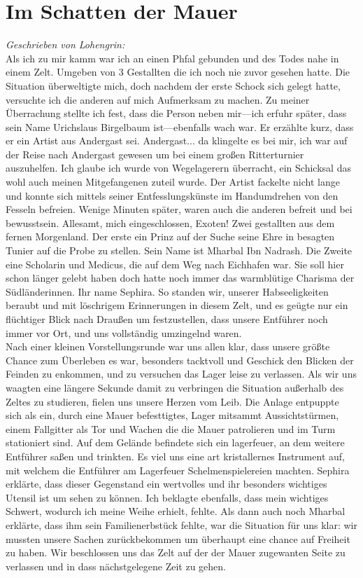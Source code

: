 \documentclass{book}
\begin{document}
    \chapter*{Im Schatten der Mauer}
    \emph{Geschrieben von Lohengrin:}\\
    Als ich zu mir kamm war ich an einen Phfal gebunden und des Todes nahe in einem Zelt. Umgeben von 3 Gestallten die ich noch nie zuvor gesehen hatte. Die Situation überweltigte mich, doch nachdem der erste Schock sich gelegt hatte, versuchte ich die anderen auf mich Aufmerksam zu machen. Zu meiner Überrachung stellte ich fest, dass die Person neben mir---ich erfuhr später, dass sein Name Urichslaus Birgelbaum ist---ebenfalls wach war. Er erzählte kurz, dass er ein Artist aus Andergast sei. Andergast... da klingelte es bei mir, ich war auf der Reise nach Andergast gewesen um bei einem großen Ritterturnier auszuhelfen. Ich glaube ich wurde von Wegelagerern überracht, ein Schicksal das wohl auch meinen Mitgefangenen zuteil wurde. Der Artist fackelte nicht lange und konnte sich mittels seiner Entfesslungskünste im Handumdrehen von den Fesseln befreien. Wenige Minuten später, waren auch die anderen befreit und bei bewusstsein. Allesamt, mich eingeschlossen, Exoten! Zwei gestallten aus dem fernen Morgenland. Der erste ein Prinz auf der Suche seine Ehre in besagten Tunier auf die Probe zu stellen. Sein Name ist Mharbal Ibn Nadrash. Die Zweite eine Scholarin und Medicus, die auf dem Weg nach Eichhafen war. Sie soll hier schon länger gelebt haben doch hatte noch immer das warmblütige Charisma der Südländerinnen. Ihr name Sephira. So standen wir, unserer Habseeligkeiten beraubt und mit löschrigem Erinnerungen in diesem Zelt, und es geügte nur ein flüchtiger Blick nach Draußen um festzustellen, dass unsere Entführer noch immer vor Ort, und uns vollständig umzingelnd waren.\\
    Nach einer kleinen Vorstellungsrunde war uns allen klar, dass unsere größte Chance zum Überleben es war, besonders tacktvoll und Geschick den Blicken der Feinden zu enkommen, und zu versuchen das Lager leise zu verlassen. Als wir uns waagten eine längere Sekunde damit zu verbringen die Situation außerhalb des Zeltes zu studieren, fielen uns unsere Herzen vom Leib. Die Anlage entpuppte sich als ein, durch eine Mauer befesttigtes, Lager mitsammt Aussichtstürmen, einem Fallgitter als Tor und Wachen die die Mauer patrolieren und im Turm stationiert sind. Auf dem Gelände befindete sich ein lagerfeuer, an dem weitere Entführer saßen und trinkten. Es viel uns eine art kristallernes Instrument auf, mit welchem die Entführer am Lagerfeuer Schelmenspielereien machten. Sephira erklärte, dass dieser Gegenstand ein wertvolles und ihr besonders wichtiges Utensil ist um sehen zu können. Ich beklagte ebenfalls, dass mein wichtiges Schwert, wodurch ich meine Weihe erhielt, fehlte. Als dann auch noch Mharbal erklärte, dass ihm sein Familienerbstück fehlte, war die Situation für uns klar: wir mussten unsere Sachen zurückbekommen um überhaupt eine chance auf Freiheit zu haben. Wir beschlossen uns das Zelt auf der der Mauer zugewanten Seite zu verlassen und in dass nächstgelegene Zeit zu gehen.\\
\end{document}
